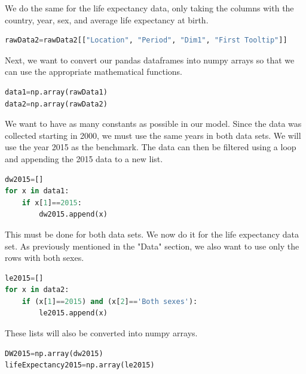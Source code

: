 \documentclass[12pt]{article}
\begin{document}
We do the same for the life expectancy data, only taking the columns with the country, year, sex, and average life expectancy at birth.
\begin{adjustwidth}{0.5in}{0.25in}
\begin{lstlisting}[language=Python]
rawData2=rawData2[["Location", "Period", "Dim1", "First Tooltip"]]
\end{lstlisting}
\end{adjustwidth}

Next, we want to convert our pandas dataframes into numpy arrays so that we can use the appropriate mathematical functions.
\begin{adjustwidth}{0.5in}{0.25in}
\begin{lstlisting}[language=Python]
data1=np.array(rawData1)
data2=np.array(rawData2)
\end{lstlisting}
\end{adjustwidth}

We want to have as many constants as possible in our model. Since the data was collected starting in 2000, we must use the same years in both data sets. We will use the year 2015 as the benchmark. The data can then be filtered using a loop and appending the 2015 data to a new list.
\begin{adjustwidth}{0.5in}{0.25in}
\begin{lstlisting}[language=Python]
dw2015=[]
for x in data1:
    if x[1]==2015:
        dw2015.append(x)
\end{lstlisting}
\end{adjustwidth}

This must be done for both data sets. We now do it for the life expectancy data set. As previously mentioned in the "Data" section, we also want to use only the rows with both sexes.
\begin{adjustwidth}{0.5in}{0.25in}
\begin{lstlisting}[language=Python]
le2015=[]
for x in data2:
    if (x[1]==2015) and (x[2]=='Both sexes'):
        le2015.append(x)
\end{lstlisting}
\end{adjustwidth}

These lists will also be converted into numpy arrays.
\begin{adjustwidth}{0.5in}{0.25in}
\begin{lstlisting}[language=Python]
DW2015=np.array(dw2015)
lifeExpectancy2015=np.array(le2015)
\end{lstlisting}
\end{adjustwidth}
\end{document}
